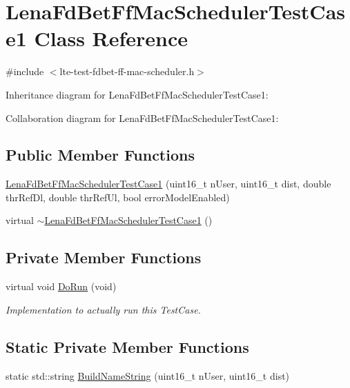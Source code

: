 \hypertarget{classLenaFdBetFfMacSchedulerTestCase1}{}\section{Lena\+Fd\+Bet\+Ff\+Mac\+Scheduler\+Test\+Case1 Class Reference}
\label{classLenaFdBetFfMacSchedulerTestCase1}


{\ttfamily \#include $<$lte-\/test-\/fdbet-\/ff-\/mac-\/scheduler.\+h$>$}



Inheritance diagram for Lena\+Fd\+Bet\+Ff\+Mac\+Scheduler\+Test\+Case1\+:


Collaboration diagram for Lena\+Fd\+Bet\+Ff\+Mac\+Scheduler\+Test\+Case1\+:
\subsection*{Public Member Functions}
\begin{DoxyCompactItemize}
\item 
\hyperlink{classLenaFdBetFfMacSchedulerTestCase1_ae7c24071973c0874323b6e799edd8d02}{Lena\+Fd\+Bet\+Ff\+Mac\+Scheduler\+Test\+Case1} (uint16\+\_\+t n\+User, uint16\+\_\+t dist, double thr\+Ref\+Dl, double thr\+Ref\+Ul, bool error\+Model\+Enabled)
\item 
virtual \hyperlink{classLenaFdBetFfMacSchedulerTestCase1_ac97803e4e0765e60b7007a3497a31d08}{$\sim$\+Lena\+Fd\+Bet\+Ff\+Mac\+Scheduler\+Test\+Case1} ()
\end{DoxyCompactItemize}
\subsection*{Private Member Functions}
\begin{DoxyCompactItemize}
\item 
virtual void \hyperlink{classLenaFdBetFfMacSchedulerTestCase1_a21b7a9f396adcc1ab24ddefc919345f2}{Do\+Run} (void)
\begin{DoxyCompactList}\small\item\em Implementation to actually run this Test\+Case. \end{DoxyCompactList}\end{DoxyCompactItemize}
\subsection*{Static Private Member Functions}
\begin{DoxyCompactItemize}
\item 
static std\+::string \hyperlink{classLenaFdBetFfMacSchedulerTestCase1_a2636b38a6a556f8a92e1aba7b147bbaf}{Build\+Name\+String} (uint16\+\_\+t n\+User, uint16\+\_\+t dist)
\end{DoxyCompactItemize}
